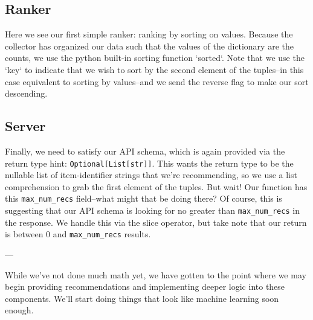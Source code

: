 \subsection{Ranker}

Here we see our first simple ranker: ranking by sorting on values. Because the collector has organized our data such that the values of the dictionary are the counts, we use the python built-in sorting function `sorted`. Note that we use the `key` to indicate that we wish to sort by the second element of the tuples–in this case equivalent to sorting by values–and we send the reverse flag to make our sort descending.

\subsection{Server}

Finally, we need to satisfy our API schema, which is again provided via the return type hint: \lstinline{Optional[List[str]]}. This wants the return type to be the nullable list of item-identifier strings that we're recommending, so we use a list comprehension to grab the first element of the tuples. But wait! Our function has this \lstinline{max_num_recs} field–what might that be doing there? Of course, this is suggesting that our API schema is looking for no greater than \lstinline{max_num_recs} in the response. We handle this via the slice operator, but take note that our return is between 0 and \lstinline{max_num_recs} results.

---

While we've not done much math yet, we have gotten to the point where we may begin providing recommendations and implementing deeper logic into these components. We'll start doing things that look like machine learning soon enough.



